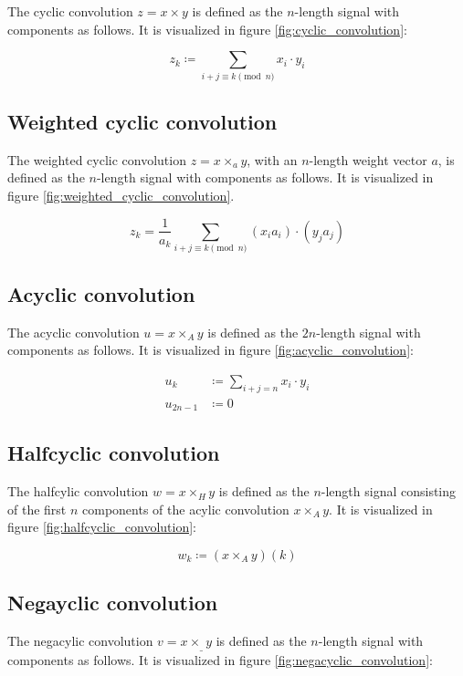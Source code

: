 The cyclic convolution $z = x \times y$ is defined as the $n$-length signal
with components as follows. It is visualized in figure
\ref{fig:cyclic_convolution}:

\[
		z_k \coloneqq \sum_{i + j \equiv k \pmod{n}} x_i \cdot y_i
\]

\subsection{Weighted cyclic convolution}

The weighted cyclic convolution $z = x \times_a y$, with an $n$-length weight
vector $a$, is defined as the $n$-length signal with components as follows. It
is visualized in figure \ref{fig:weighted_cyclic_convolution}.

\[
		z_k = \frac{1}{a_k} \sum_{i + j \equiv k \pmod{n}} (x_i a_i) \cdot (y_j a_j)
\]

\subsection{Acyclic convolution}

The acyclic convolution $u = x \times_A y$ is defined as the $2n$-length signal
with components as follows. It is visualized in figure
\ref{fig:acyclic_convolution}:

\begin{align*}
		u_k & \coloneqq \sum_{i + j = n} x_i \cdot y_i \\
		u_{2n - 1} & \coloneqq 0
\end{align*}

\subsection{Halfcyclic convolution}

The halfcylic convolution $w = x \times_H y$ is defined as the $n$-length
signal consisting of the first $n$ components of the acylic convolution $x
\times_A y$. It is visualized in figure \ref{fig:halfcyclic_convolution}:

\[
		w_k \coloneqq (x \times_A y)(k)
\]

\subsection{Negayclic convolution}

The negacylic convolution $v = x \times_\_ y$ is defined as the $n$-length signal
with components as follows. It is visualized in figure
\ref{fig:negacyclic_convolution}:

